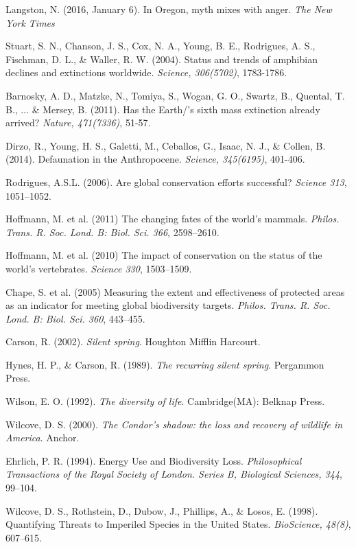 \documentclass[rutwik_proposal.tex]{subfiles}
\begin{document}
\begin{thebibliography}{100}
Langston, N.
(2016, January 6).
In Oregon, myth mixes with anger.
\emph{The New York Times}

Stuart, S. N., Chanson, J. S., Cox, N. A., Young, B. E., Rodrigues, A. S., Fischman, D. L., \& Waller, R. W.
(2004).
Status and trends of amphibian declines and extinctions worldwide.
\emph{Science, 306(5702)},
1783-1786.

Barnosky, A. D., Matzke, N., Tomiya, S., Wogan, G. O., Swartz, B., Quental, T. B., ... \& Mersey, B.
(2011).
Has the Earth/'s sixth mass extinction already arrived?
\emph{Nature, 471(7336)},
51-57.

Dirzo, R., Young, H. S., Galetti, M., Ceballos, G., Isaac, N. J., \& Collen, B.
(2014).
Defaunation in the Anthropocene.
\emph{Science, 345(6195)},
401-406.

Rodrigues, A.S.L.
(2006).
Are global conservation efforts successful?
\emph{Science 313},
1051–1052.

Hoffmann, M. et al.
(2011)
The changing fates of the world’s mammals.
\emph{Philos. Trans. R. Soc. Lond. B: Biol. Sci. 366},
2598–2610.

Hoffmann, M. et al.
(2010)
The impact of conservation on the status of the world’s vertebrates.
\emph{Science 330},
1503–1509.

Chape, S. et al.
(2005)
Measuring the extent and effectiveness of protected areas as an indicator for meeting global biodiversity targets.
\emph{Philos. Trans. R. Soc. Lond. B: Biol. Sci. 360},
443–455.

Carson, R.
(2002).
\emph{Silent spring}.
Houghton Mifflin Harcourt.

Hynes, H. P., \& Carson, R.
(1989).
\emph{The recurring silent spring}.
Pergammon Press.

Wilson, E. O.
(1992).
\emph{The diversity of life}.
Cambridge(MA): Belknap Press.

Wilcove, D. S.
(2000).
\emph{The Condor's shadow: the loss and recovery of wildlife in America}.
Anchor.

Ehrlich, P. R.
(1994). 
Energy Use and Biodiversity Loss. 
\emph{Philosophical Transactions of the Royal Society of London. Series B, Biological Sciences, 344},
99–104.

Wilcove, D. S., Rothstein, D., Dubow, J., Phillips, A., \& Losos, E.
(1998). 
Quantifying Threats to Imperiled Species in the United States. 
\emph{BioScience, 48(8)},
607–615.


\end{thebibliography}
\end{document}
